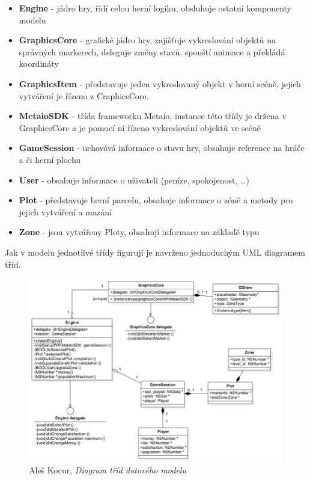\documentclass[twoside,12pt]{article}
\begin{document}
\begin{itemize}
	\item \textbf{Engine} - jádro hry, řídí celou herní logiku, obsluhuje ostatní komponenty modelu
	\item \textbf{GraphicsCore} - grafické jádro hry, zajišťuje vykreslování objektů na správných markerech, deleguje změny stavů, spouští animace a překládá koordináty
	\item \textbf{GraphicsItem} - představuje jeden vykreslovaný objekt v herní scéně, jejich vytváření je řízeno z CraphicsCore.
	\item \textbf{MetaioSDK} - třída frameworku Metaio, instance této třídy je držena v GraphicsCore a je pomocí ní řízeno vykreslování objektů ve scéně
	\item \textbf{GameSession} - uchovává informace o stavu hry, obsahuje reference na hráče a či herní plochu
	\item \textbf{User} - obsahuje informace o uživateli (peníze, spokojenost, \dots)
	\item \textbf{Plot} - představuje herní parcelu, obsahuje informace o zóně a metody pro jejich vytváření a mazání
	\item \textbf{Zone} - jsou vytvářeny Ploty, obsahují informace na základě typu
\end{itemize}

Jak v modelu jednotlivé třídy figurují je navrženo jednoduchým UML diagramem tříd.

\begin{figure}[H]
\centering
    \includegraphics[width=420px, center]{images/model.png}
\captionsetup{justification=centering}
    \caption{Aleš Kocur, \textit{Diagram tříd datového modelu}}
    \label{class_diagram}
\end{figure}
\end{document}
